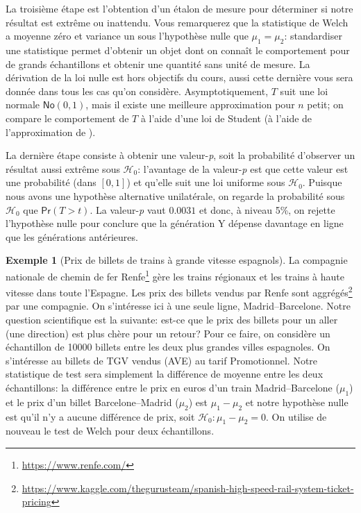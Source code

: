 \documentclass[
  11pt,
  letterpaper,
]{book}
\renewcommand{\href}[2]{#2\footnote{\url{#1}}}
\theoremstyle{definition}
\theoremstyle{definition}
\newtheorem{example}{Exemple}[chapter]
\theoremstyle{definition}
\theoremstyle{remark}
\begin{document}
La troisième étape est l'obtention d'un étalon de mesure pour déterminer si notre résultat est extrême ou inattendu. Vous remarquerez que la statistique de Welch a moyenne zéro et variance un sous l'hypothèse nulle que \(\mu_1=\mu_2\): standardiser une statistique permet d'obtenir un objet dont on connaît le comportement pour de grands échantillons et obtenir une quantité sans unité de mesure. La dérivation de la loi nulle est hors objectifs du cours, aussi cette dernière vous sera donnée dans tous les cas qu'on considère. Asymptotiquement, \(T\) suit une loi normale \(\mathsf{No}(0, 1)\), mais il existe une meilleure approximation pour \(n\) petit; on compare le comportement de \(T\) à l'aide d'une loi de Student (à l'aide de l'approximation de \citet{Satterthwaite:1946}).

La dernière étape consiste à obtenir une valeur-\emph{p}, soit la probabilité d'observer un résultat aussi extrême sous \(\mathscr{H}_0\): l'avantage de la valeur-\emph{p} est que cette valeur est une probabilité (dans \([0, 1]\)) et qu'elle suit une loi uniforme sous \(\mathscr{H}_0\). Puisque nous avons une hypothèse alternative unilatérale, on regarde la probabilité sous \(\mathscr{H}_0\) que \(\mathsf{Pr}(T > t)\). La valeur-\emph{p} vaut \(0.0031\) et donc, à niveau 5\%, on rejette l'hypothèse nulle pour conclure que la génération Y dépense davantage en ligne que les générations antérieures.

\begin{example}[Prix de billets de trains à grande vitesse espagnols]
\protect\hypertarget{exm:prix-trains-tests}{}{\label{exm:prix-trains-tests} {} }La compagnie nationale de chemin de fer \href{https://www.renfe.com/}{Renfe} gère les trains régionaux et les trains à haute vitesse dans toute l'Espagne. Les prix des billets vendus par Renfe sont \href{https://www.kaggle.com/thegurusteam/spanish-high-speed-rail-system-ticket-pricing}{aggrégés} par une compagnie. On s'intéresse ici à une seule ligne, Madrid--Barcelone. Notre question scientifique est la suivante: est-ce que le prix des billets pour un aller (une direction) est plus chère pour un retour? Pour ce faire, on considère un échantillon de 10000 billets entre les deux plus grandes villes espagnoles. On s'intéresse au billets de TGV vendus (AVE) au tarif Promotionnel. Notre statistique de test sera simplement la différence de moyenne entre les deux échantillons: la différence entre le prix en euros d'un train Madrid--Barcelone (\(\mu_1\)) et le prix d'un billet Barcelone--Madrid (\(\mu_2\)) est \(\mu_1-\mu_2\) et notre hypothèse nulle est qu'il n'y a aucune différence de prix, soit \(\mathscr{H}_0: \mu_1-\mu_2=0\). On utilise de nouveau le test de Welch pour deux échantillons.
\end{example}
\end{document}
